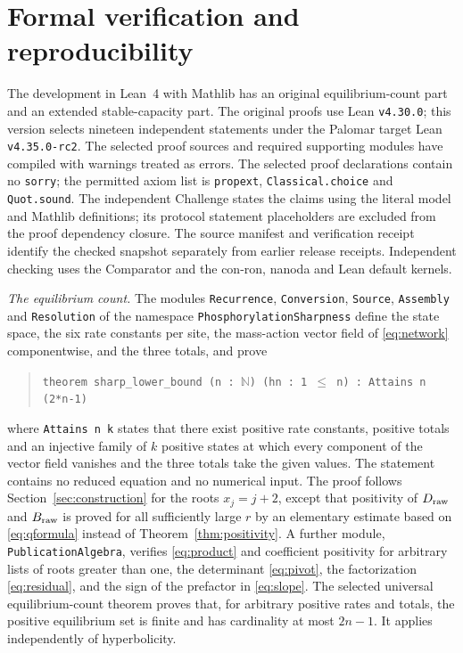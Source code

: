 \section{Formal verification and reproducibility}\label{sec:formal}
The development in Lean~4 \cite{Lean4} with Mathlib \cite{Mathlib} has an original
equilibrium-count part and an extended stable-capacity part. The original proofs use Lean
\texttt{v4.30.0}; this version selects nineteen independent statements under the Palomar
target Lean \texttt{v4.35.0-rc2}. The selected proof sources and required supporting modules
have compiled with warnings treated as errors.
The selected proof declarations contain no \texttt{sorry}; the permitted axiom list is
\texttt{propext}, \texttt{Classical.choice} and \texttt{Quot.sound}.
The independent Challenge states the claims using the literal model
and Mathlib definitions; its protocol statement placeholders are excluded from the proof
dependency closure. The source manifest and verification receipt identify the checked
snapshot separately from earlier release receipts. Independent checking uses the
Comparator and the con-ron, nanoda and Lean default kernels.

\emph{The equilibrium count.} The modules \texttt{Recurrence}, \texttt{Conversion},
\texttt{Source}, \texttt{Assembly} and \texttt{Resolution} of the namespace
\texttt{PhosphorylationSharpness} define the state space, the six rate constants per site, the
mass-action vector field of \eqref{eq:network} componentwise, and the three totals, and prove
\begin{quote}
\texttt{theorem sharp\_lower\_bound (n :\ $\mathbb N$) (hn :\ 1 $\le$ n) :\ Attains n (2*n-1)}
\end{quote}
where \texttt{Attains n k} states that there exist positive rate constants, positive totals and
an injective family of \(k\) positive states at which every component of the vector field
vanishes and the three totals take the given values. The statement contains no reduced
equation and no numerical input. The proof follows Section~\ref{sec:construction} for the roots
\(x_j=j+2\), except that positivity of \(D_{\mathrm{raw}}\) and \(B_{\mathrm{raw}}\) is proved for all
sufficiently large \(r\) by an elementary estimate based on \eqref{eq:qformula} instead of
Theorem~\ref{thm:positivity}. A further module, \texttt{PublicationAlgebra}, verifies
\eqref{eq:product} and coefficient positivity for arbitrary lists of roots greater than one,
the determinant \eqref{eq:pivot}, the factorization \eqref{eq:residual}, and the sign of the
prefactor in \eqref{eq:slope}.
The selected universal equilibrium-count theorem proves that, for arbitrary positive
rates and totals, the positive equilibrium set is finite and has cardinality at most
\(2n-1\). It applies independently of hyperbolicity.


